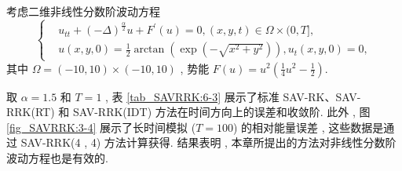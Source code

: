 	\begin{example}\label{exp_SAVRRK:3}
		考虑二维非线性分数阶波动方程\cite{wangUnconditionalEnergyDissipation2021} 
		\begin{equation}
		\begin{cases}
		& u_{t t}+(-\Delta)^{\frac{\alpha}{2}} u+F^{\prime}(u)=0 , (x , y , t) \in \Omega \times(0 , T] , \\
		& u(x , y , 0)=\frac{1}{2} \arctan \left(\exp \left(-\sqrt{x^2+y^2}\right)\right) , u_t(x , y , 0)=0 , 
		\end{cases}
		\end{equation}
		其中 $\Omega=(-10 , 10) \times(-10 , 10)$ , 势能 $F(u)=u^2\left(\frac{1}{4} u^2-\frac{1}{2}\right)$.
		\end{example}
		
		取 $\alpha=1.5$ 和 $T=1$ , 表 \ref{tab_SAVRRK:6-3} 展示了标准 SAV-RK、SAV-RRK(RT) 和 SAV-RRK(IDT) 方法在时间方向上的误差和收敛阶.
		此外 , 图 \ref{fig_SAVRRK:3-4} 展示了长时间模拟 ($T=100$) 的相对能量误差 , 这些数据是通过 SAV-RRK(4 , 4) 方法计算获得.
		结果表明 , 本章所提出的方法对非线性分数阶波动方程也是有效的.


